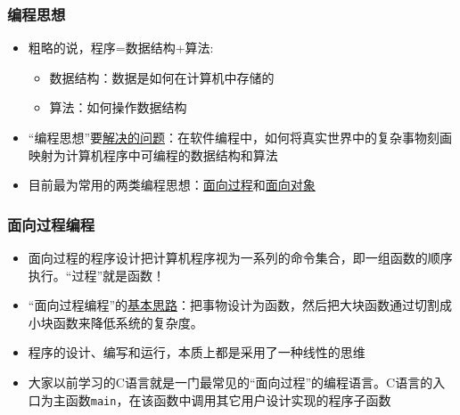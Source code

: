 \begin{frame}
  \frametitle{编程思想}
  \begin{itemize}
    \item 粗略的说，程序=数据结构+算法:
      \begin{itemize}
        \item 数据结构：数据是如何在计算机中存储的
        \item 算法：如何操作数据结构
      \end{itemize}
    \item “编程思想”要\underline{解决的问题}：在软件编程中，如何将真实世界中的复杂事物刻画映射为计算机程序中可编程的数据结构和算法
    \item 目前最为常用的两类编程思想：\underline{面向过程}和\underline{面向对象}
  \end{itemize}
\end{frame}

\begin{frame}
  \frametitle{面向过程编程}
  \begin{itemize}
    \item 面向过程的程序设计把计算机程序视为一系列的命令集合，即一组函数的顺序执行。“过程”就是函数！
    \item “面向过程编程”的\underline{基本思路}：把事物设计为函数，然后把大块函数通过切割成小块函数来降低系统的复杂度。
    \item 程序的设计、编写和运行，本质上都是采用了一种线性的思维
    \item 大家以前学习的C语言就是一门最常见的“面向过程”的编程语言。C语言的入口为主函数\texttt{main}，在该函数中调用其它用户设计实现的程序子函数
  \end{itemize}
\end{frame}

